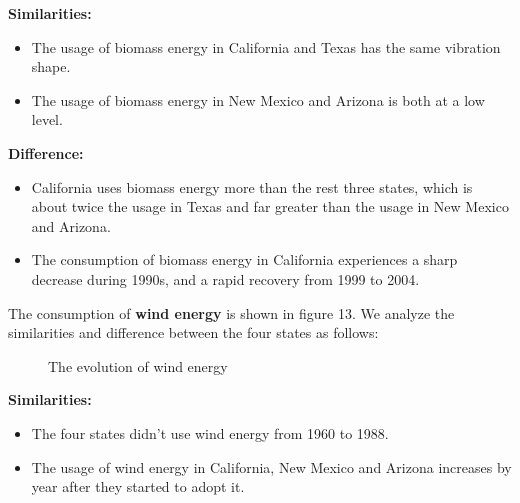 \documentclass{mcmthesis}
\begin{document}
{\bf{Similarities:}}

\begin{itemize}
\item The usage of biomass energy in California and Texas has the same vibration shape.
\item The usage of biomass energy in New Mexico and Arizona is both at a low level.
\end{itemize}

{\bf{Difference:}}

\begin{itemize}
\item California uses biomass energy more than the rest three states, which is about twice the usage in Texas and far greater than the usage in New Mexico and Arizona.
\item The consumption of biomass energy in California experiences a sharp decrease during 1990s, and a rapid recovery from 1999 to 2004.
\end{itemize}

The consumption of {\bf{wind energy}} is shown in figure 13. We analyze the similarities and difference between the four states as follows:

\begin{figure}[H]
  \caption{The evolution of wind energy}\label{figure13}
\end{figure}

{\bf{Similarities:}}

\begin{itemize}
\item The four states didn't use wind energy from 1960 to 1988.
\item The usage of wind energy in California, New Mexico and Arizona increases by year after they started to adopt it.
\end{itemize}
\end{document}
